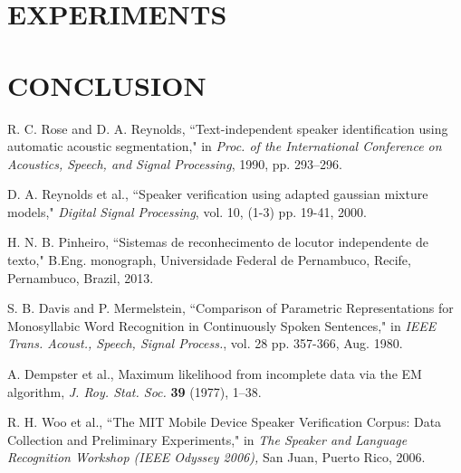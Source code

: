 \documentclass[a4paper,twocolumn]{article}
\begin{document}
\section{EXPERIMENTS}


\section{CONCLUSION}


\begin{thebibliography}{9}
        R. C. Rose and D. A. Reynolds,
        ``Text-independent speaker identification using automatic acoustic segmentation,"
        in \textit{Proc. of the International Conference on Acoustics, Speech, and
        Signal Processing},
        1990,
        pp. 293–296.

        D. A. Reynolds et al.,
        ``Speaker verification using adapted gaussian mixture models,"
        \textit{Digital Signal Processing}, vol. 10,
        (1-3) pp. 19-41,
        2000.

        H. N. B. Pinheiro,
        ``Sistemas de reconhecimento de locutor independente de texto,"
        B.Eng. monograph, Universidade Federal de Pernambuco,
        Recife, Pernambuco, Brazil,
        2013.

        S. B. Davis and P. Mermelstein,
        ``Comparison of Parametric Representations for Monosyllabic Word Recognition in Continuously Spoken Sentences,"
        in \textit{IEEE Trans. Acoust., Speech, Signal Process.},
        vol. 28
        pp. 357-366,
        Aug. 1980.

        A. Dempster et al.,
        Maximum likelihood from incomplete data via the EM algorithm,
        \textit{J. Roy. Stat. Soc.} \textbf{39} (1977), 1–38.

        R. H. Woo et al.,
        ``The MIT Mobile Device Speaker Verification Corpus: Data Collection and Preliminary Experiments,"
        in \textit{The Speaker and Language Recognition Workshop (IEEE Odyssey 2006),}
        San Juan, Puerto Rico, 2006.

\end{thebibliography}
\end{document}
